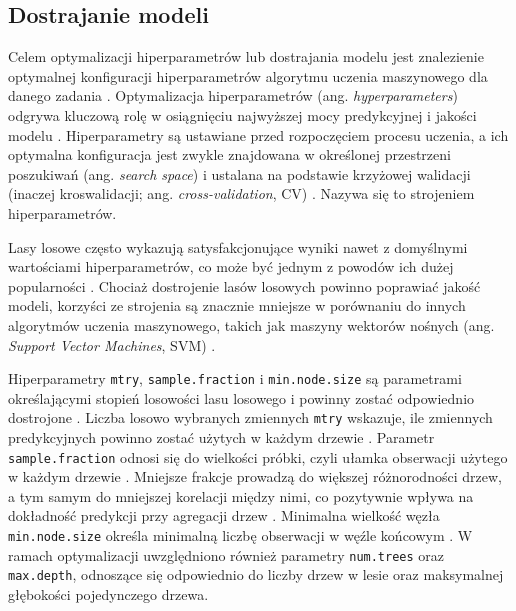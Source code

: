 \documentclass{amuthesis}
\begin{document}
\hypertarget{dostrajanie-modeli}{%
\subsection{Dostrajanie modeli}\label{dostrajanie-modeli}}

Celem optymalizacji hiperparametrów lub dostrajania modelu jest
znalezienie optymalnej konfiguracji hiperparametrów algorytmu uczenia
maszynowego dla danego zadania \autocite{bischl_2024_mlr3}.
Optymalizacja hiperparametrów (ang. \emph{hyperparameters}) odgrywa
kluczową rolę w osiągnięciu najwyższej mocy predykcyjnej i jakości
modelu \autocite{schratz_2019_hyperparameters}. Hiperparametry są
ustawiane przed rozpoczęciem procesu uczenia, a ich optymalna
konfiguracja jest zwykle znajdowana w określonej przestrzeni poszukiwań
(ang. \emph{search space}) i ustalana na podstawie krzyżowej walidacji
(inaczej kroswalidacji; ang. \emph{cross-validation}, CV)
\autocite{lovelace_2019_geocomputation}. Nazywa się to strojeniem
hiperparametrów.

Lasy losowe często wykazują satysfakcjonujące wyniki nawet z domyślnymi
wartościami hiperparametrów, co może być jednym z powodów ich dużej
popularności \autocite{lovelace_2019_geocomputation}. Chociaż
dostrojenie lasów losowych powinno poprawiać jakość modeli, korzyści ze
strojenia są znacznie mniejsze w porównaniu do innych algorytmów uczenia
maszynowego, takich jak maszyny wektorów nośnych (ang. \emph{Support
Vector Machines}, SVM) \autocite{probst_2019_hyperparameters}.

Hiperparametry \texttt{mtry}, \texttt{sample.fraction} i
\texttt{min.node.size} są parametrami określającymi stopień losowości
lasu losowego i powinny zostać odpowiednio dostrojone
\autocite{probst_2019_hyperparameters}. Liczba losowo wybranych
zmiennych \texttt{mtry} wskazuje, ile zmiennych predykcyjnych powinno
zostać użytych w każdym drzewie \autocite{lovelace_2019_geocomputation}.
Parametr \texttt{sample.fraction} odnosi się do wielkości próbki, czyli
ułamka obserwacji użytego w każdym drzewie
\autocite{lovelace_2019_geocomputation}. Mniejsze frakcje prowadzą do
większej różnorodności drzew, a tym samym do mniejszej korelacji między
nimi, co pozytywnie wpływa na dokładność predykcji przy agregacji drzew
\autocite{probst_2019_hyperparameters}. Minimalna wielkość węzła
\texttt{min.node.size} określa minimalną liczbę obserwacji w węźle
końcowym \autocite{probst_2019_hyperparameters}. W ramach optymalizacji
uwzględniono również parametry \texttt{num.trees} oraz
\texttt{max.depth}, odnoszące się odpowiednio do liczby drzew w lesie
oraz maksymalnej głębokości pojedynczego drzewa.
\end{document}
